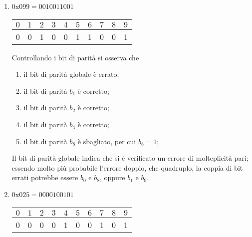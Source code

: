 \documentclass[a4paper]{extarticle}
\renewcommand\arraystretch{}
\begin{document}
\begin{enumerate}
    \item $0$x$099 = 00 1001 1001$

    \noindent
    \begin{table}[H]
    \setlength{\tabcolsep}{4pt}
    \renewcommand{\arraystretch}{1.2}
    \centering
    \begin{tabular}{|c|c|c|c|c|c|c|c|c|c|}
        \hline
        $0$ & $1$ & $2$ & $3$ & $4$ & $5$ & $6$ & $7$ & $8$ & $9$\\
        \hline
        \cellcolor{orange!75!white}0 & \cellcolor{orange!25!white}0 &\cellcolor{orange!25!white}1 & 0 & \cellcolor{orange!25!white}0 & 1 & 1 & 0 & \cellcolor{orange!25!white}0 & 1\\
        \hline
    \end{tabular}
    \end{table}

    \vspace{1em}
    \noindent
    Controllando i bit di parità si osserva che
    \begin{enumerate}
        \item il bit di parità globale è errato;
        \item il bit di parità $b_1$ è corretto;
        \item il bit di parità $b_2$ è corretto;
        \item il bit di parità $b_4$ è corretto;
        \item il bit di parità $b_8$ è sbagliato, per cui $b_8=1$; 
    \end{enumerate}
    Il bit di parità globale indica che si è verificato un errore di molteplicità pari; essendo molto più probabile l'errore doppio, che quadruplo, la coppia di bit errati potrebbe essere $b_0$ e $b_8$, oppure $b_1$ e $b_9$.

    \item $0$x$025 = 00 0010 0101$

    \noindent
    \begin{table}[H]
    \setlength{\tabcolsep}{4pt}
    \renewcommand{\arraystretch}{1.2}
    \centering
    \begin{tabular}{|c|c|c|c|c|c|c|c|c|c|}
        \hline
        $0$ & $1$ & $2$ & $3$ & $4$ & $5$ & $6$ & $7$ & $8$ & $9$\\
        \hline
        \cellcolor{orange!75!white}0 & \cellcolor{orange!25!white}0 &\cellcolor{orange!25!white}0 & 0 & \cellcolor{orange!25!white}1 & 0 & 0 & 1 & \cellcolor{orange!25!white}0 & 1\\
        \hline
    \end{tabular}
    \end{table}


\end{enumerate}
\end{document}
